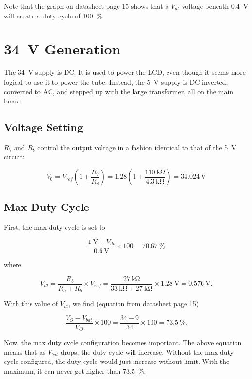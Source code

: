 \documentclass{article}
\newcommand{\Vbat}{$V_{bat}$}
\begin{document}
Note that the graph on datasheet page 15 shows that a $V_{dt}$ voltage
beneath \qty{0.4}{\volt} will create a duty cycle of \qty{100}{\%}.

\section{\qty{34}{\volt} Generation}
The \qty{34}{\volt} supply is DC. It is used to power the LCD, even
though it seems more logical to use it to power the tube. Instead, the
\qty{5}{\volt} supply is DC-inverted, converted to AC, and stepped up
with the large transformer, all on the main board.

\subsection{Voltage Setting}
$R_7$ and $R_8$ control the output voltage in a fashion identical to
that of the \qty{5}{\volt} circuit:

\begin{displaymath}
  V_0 = V_{ref}(1+\frac{R_7}{R_8}) =
  1.28(1+\frac{\qty{110}{\kilo\ohm}}{\qty{4.3}{\kilo\ohm}}) = \qty{34.024}{\volt}
\end{displaymath}

\subsection{Max Duty Cycle}
First, the max duty cycle is set to

\begin{displaymath}
  \frac{\qty{1}{\volt} - V_{dt}}{\qty{0.6}{\volt}} \times{} 100 = \qty{70.67}{\%}
\end{displaymath}

\noindent
where

\begin{displaymath}
  V_{dt} = \frac{R_b}{R_a+R_b} \times{} V_{ref} =
  \frac{\qty{27}{\kilo\ohm}}{\qty{33}{\kilo\ohm} +
    \qty{27}{\kilo\ohm}} \times \qty{1.28}{\volt} = \qty{0.576}{\volt}.
\end{displaymath}

With this value of $V_{dt}$, we find (equation from datasheet page 15)

\begin{displaymath}
  \frac{V_O - V_{bat}}{V_O} \times{} 100 = \frac{34 - 9}{34} \times{}
  100 = \qty{73.5}{\%}.
\end{displaymath}

Now, the max duty cycle configuration becomes important. The above
equation means that as \Vbat{} drops, the duty cycle will
increase. Without the max duty cycle configured, the duty cycle would
just increase without limit. With the maximum, it can never get higher
than \qty{73.5}{\%}.
\end{document}
